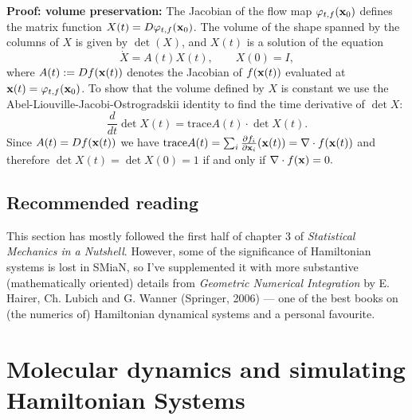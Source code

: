 \documentclass{article}
\begin{document}
{\bf Proof: volume preservation:}
The Jacobian of the flow map $\varphi_{t,f}({\bf x}_0)$ defines the matrix function $X(t)=D\varphi_{t,f}({\bf x}_0)$. The volume of the shape spanned by the columns of $X$ is given by $\det(X)$, and $X(t)$ is a solution of the equation
$$
\dot{X}=A(t)X(t),\qquad X(0)=I,
$$
where $A(t):=Df({\bf x}(t))$ denotes the Jacobian of $f({\bf x}(t))$ evaluated at ${\bf x}(t)=\varphi_{t,f}({\bf x}_0)$. To show that the volume defined by $X$ is constant we use  the Abel-Liouville-Jacobi-Ostrogradskii identity to find the time derivative of $\det X$:
$$
\frac{d}{dt}\det X(t)=\text{trace} A(t)\cdot\det X(t).
$$
Since $A(t)=Df({\bf x}(t))$ we have $\text{trace} A(t)=\sum_i\frac{\partial f_i}{\partial {\bf x}_i}({\bf x}(t))=\nabla\cdot f({\bf x}(t))$ and therefore $\det X(t)=\det X(0)=1$ if and only if $\nabla\cdot f({\bf x})=0.$

\subsection*{Recommended reading}
This section has mostly followed the first half of chapter 3 of \emph{Statistical Mechanics in a Nutshell}. However, some of the significance of Hamiltonian systems is lost in SMiaN, so I've supplemented it with more substantive (mathematically oriented) details from \emph{Geometric Numerical Integration} by E. Hairer, Ch. Lubich and G. Wanner (Springer, 2006) --- one of the best books on (the numerics of) Hamiltonian dynamical systems and a personal favourite.

\section*{Molecular dynamics and simulating Hamiltonian Systems}
\end{document}
